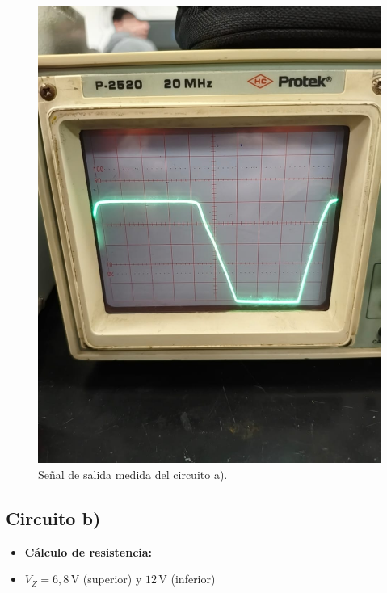 \documentclass[chaptersright]{informeutn}
\begin{document}
\begin{figure}[H]
\begin{minipage}{0.4\textwidth}
    \includegraphics[width=\textwidth]{pictures/circuito_A_osciloscopio.jpeg}
    \caption{Señal de salida medida del circuito a).}
\end{minipage}
\end{figure}


\subsection*{Circuito b)}

\begin{itemize}
    \item \textbf{Cálculo de resistencia:} 
    \item \( V_Z = 6{,}8\,\text{V} \) (superior) y \( 12\,\text{V} \) (inferior)
\end{itemize}
\end{document}
